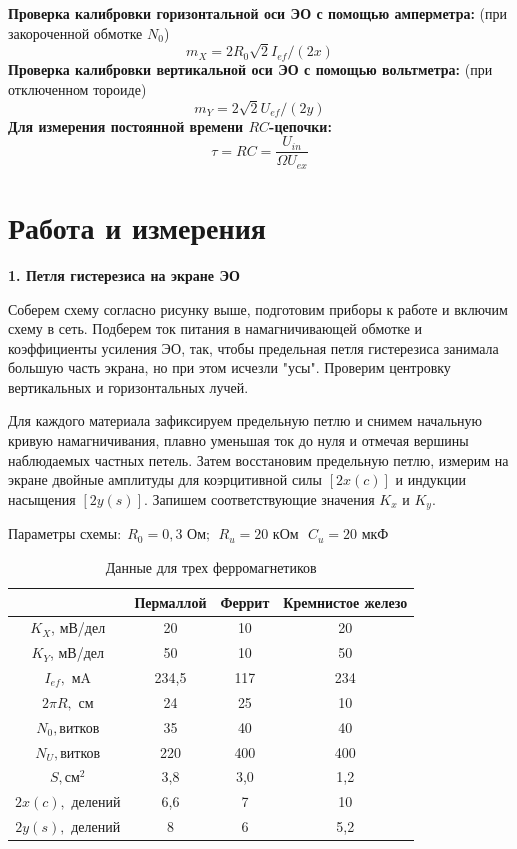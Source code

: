 \documentclass[a4paper, 12pt]{article}
\begin{document}
\textbf{Проверка калибровки горизонтальной оси ЭО с помощью амперметра:} (при закороченной обмотке $N_0$) 
$$
m_X=2R_0\sqrt{2}I_{ef}/(2x) 
$$
\textbf{Проверка калибровки вертикальной оси ЭО с помощью вольтметра:} (при отключенном тороиде)
$$
m_Y=2\sqrt{2}U_{ef}/(2y) 
$$
\textbf{Для измерения постоянной времени $RC$-цепочки:}
$$
\tau=RC=\frac{U_{in}}{\Omega U_{ex}}
$$

\bigskip


\section{Работа и измерения}
\begin{center}
\textbf{1. Петля гистерезиса на экране ЭО}
\end{center}

Соберем схему согласно рисунку выше, подготовим приборы к работе и включим схему в сеть. Подберем ток питания в намагничивающей обмотке и коэффициенты усиления ЭО, так, чтобы предельная петля гистерезиса занимала большую часть экрана, но при этом исчезли "усы". Проверим центровку вертикальных и горизонтальных лучей.

Для каждого материала зафиксируем предельную петлю и снимем начальную кривую намагничивания, плавно уменьшая ток до нуля и отмечая вершины наблюдаемых частных петель. Затем восстановим предельную петлю, измерим на экране двойные амплитуды для коэрцитивной силы $[2x(c)]$ и индукции насыщения $[2y(s)]$. Запишем соответствующие значения $K_x$ и $K_y$.

Параметры схемы:$~~R_0=0,3\text{ Ом};~~R_u=20\text{ кОм}~~~C_u=20\text{ мкФ}$
\begin{table}[H]
	\centering
\begin{tabular}{|c|c|c|c|}
	\hline 
	 &Пермаллой& Феррит&Кремнистое железо \\ \hline 
	$K_X$, мВ/дел & 20&10&20  \\ \hline
	$K_Y$, мВ/дел & 50&10&50 \\ \hline
	$I_{ef},$ мA &234,5  &117&234\\ \hline
	$2\pi R,$ см & 24 &25&10\\ \hline
	$N_0,$витков & 35 &40&40\\ \hline
	$N_U,$витков & 220 &400&400\\ \hline
	$S, \text{см}^2$ & 3,8 &3,0&1,2\\ \hline
	$2x(c),$ делений& 6,6&7&10\\ \hline
	$2y(s),$ делений& 8&6&5,2\\ 	\hline
\end{tabular}
\caption{Данные для трех ферромагнетиков}
\end{table}
\end{document}
